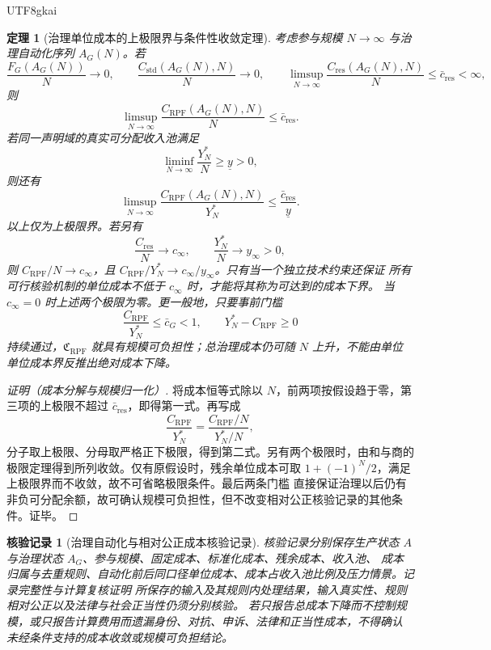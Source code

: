 \documentclass[12pt,a4paper,openany]{report}
\newtheorem{theorem}{定理}[chapter]
\newtheorem{Certificate}{核验记录}[chapter]
\begin{document}
\begin{CJK*}{UTF8}{gkai}
\begin{theorem}[治理单位成本的上极限界与条件性收敛定理]
\label{thm:rpf-unit-cost-collapse}
考虑参与规模 \(N\to\infty\) 与治理自动化序列 \(A_G(N)\)。若
\[
  \frac{F_G(A_G(N))}{N}\to0,
  \qquad
  \frac{C_{\mathrm{std}}(A_G(N),N)}{N}\to0,
  \qquad
  \limsup_{N\to\infty}
  \frac{C_{\mathrm{res}}(A_G(N),N)}{N}
  \le\bar c_{\mathrm{res}}<\infty,
\]
则
\[
  \limsup_{N\to\infty}
  \frac{C_{\mathrm{RPF}}(A_G(N),N)}{N}
  \le\bar c_{\mathrm{res}}.
\]
若同一声明域的真实可分配收入池满足
\[
  \liminf_{N\to\infty}\frac{Y_N^*}{N}\ge\underline y>0,
\]
则还有
\[
  \limsup_{N\to\infty}
  \frac{C_{\mathrm{RPF}}(A_G(N),N)}{Y_N^*}
  \le\frac{\bar c_{\mathrm{res}}}{\underline y}.
\]
以上仅为上极限界。若另有
\[
 \frac{C_{\mathrm{res}}}{N}\to c_\infty,\qquad
 \frac{Y_N^*}{N}\to y_\infty>0,
\]
则 \(C_{\mathrm{RPF}}/N\to c_\infty\)，且
\(C_{\mathrm{RPF}}/Y_N^*\to c_\infty/y_\infty\)。只有当一个独立技术约束还保证
所有可行核验机制的单位成本不低于 \(c_\infty\) 时，才能将其称为可达到的成本下界。
当 \(c_\infty=0\) 时上述两个极限为零。更一般地，只要事前门槛
\[
  \frac{C_{\mathrm{RPF}}}{Y_N^*}\le\bar c_G<1,
  \qquad
  Y_N^*-C_{\mathrm{RPF}}\ge0
\]
持续通过，\(\mathfrak C_{\mathrm{RPF}}\) 就具有规模可负担性；总治理成本仍可随 \(N\) 上升，不能由单位
单位成本界反推出绝对成本下降。
\end{theorem}

\begin{proof}[证明（成本分解与规模归一化）]
将成本恒等式除以 \(N\)，前两项按假设趋于零，第三项的上极限不超过
\(\bar c_{\mathrm{res}}\)，即得第一式。再写成
\[
  \frac{C_{\mathrm{RPF}}}{Y_N^*}
  =
  \frac{C_{\mathrm{RPF}}/N}{Y_N^*/N},
\]
分子取上极限、分母取严格正下极限，得到第二式。另有两个极限时，由和与商的极限定理得到所列收敛。仅有原假设时，残余单位成本可取 $1+(-1)^N/2$，满足上极限界而不收敛，故不可省略极限条件。最后两条门槛
直接保证治理以后仍有非负可分配余额，故可确认规模可负担性，但不改变相对公正核验记录的其他条件。证毕。
\end{proof}

\begin{Certificate}[治理自动化与相对公正成本核验记录]
核验记录分别保存生产状态 \(A\) 与治理状态 \(A_G\)、参与规模、固定成本、标准化成本、残余成本、收入池、
成本归属与去重规则、自动化前后同口径单位成本、成本占收入池比例及压力情景。记录完整性与计算复核证明
所保存的输入及其规则内处理结果，输入真实性、规则相对公正以及法律与社会正当性仍须分别核验。
若只报告总成本下降而不控制规模，或只报告计算费用而遗漏身份、对抗、申诉、法律和正当性成本，不得确认
未经条件支持的成本收敛或规模可负担结论。
\end{Certificate}


\end{CJK*}
\end{document}
